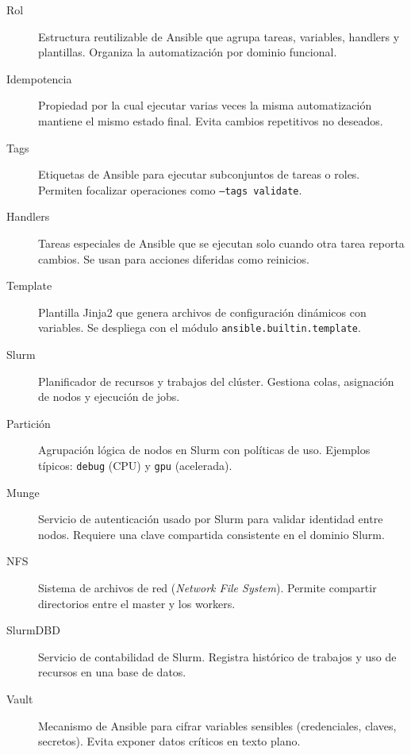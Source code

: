 \begin{description}
  \item[Rol] Estructura reutilizable de Ansible que agrupa tareas, variables, handlers y plantillas. Organiza la automatización por dominio funcional.

  \item[Idempotencia] Propiedad por la cual ejecutar varias veces la misma automatización mantiene el mismo estado final. Evita cambios repetitivos no deseados.

  \item[Tags] Etiquetas de Ansible para ejecutar subconjuntos de tareas o roles. Permiten focalizar operaciones como \texttt{--tags validate}.

  \item[Handlers] Tareas especiales de Ansible que se ejecutan solo cuando otra tarea reporta cambios. Se usan para acciones diferidas como reinicios.

  \item[Template] Plantilla Jinja2 que genera archivos de configuración dinámicos con variables. Se despliega con el módulo \texttt{ansible.builtin.template}.

  \item[Slurm] Planificador de recursos y trabajos del clúster. Gestiona colas, asignación de nodos y ejecución de jobs.

  \item[Partición] Agrupación lógica de nodos en Slurm con políticas de uso. Ejemplos típicos: \texttt{debug} (CPU) y \texttt{gpu} (acelerada).

  \item[Munge] Servicio de autenticación usado por Slurm para validar identidad entre nodos. Requiere una clave compartida consistente en el dominio Slurm.

  \item[NFS] Sistema de archivos de red (\textit{Network File System}). Permite compartir directorios entre el master y los workers.

  \item[SlurmDBD] Servicio de contabilidad de Slurm. Registra histórico de trabajos y uso de recursos en una base de datos.

  \item[Vault] Mecanismo de Ansible para cifrar variables sensibles (credenciales, claves, secretos). Evita exponer datos críticos en texto plano.
\end{description}
